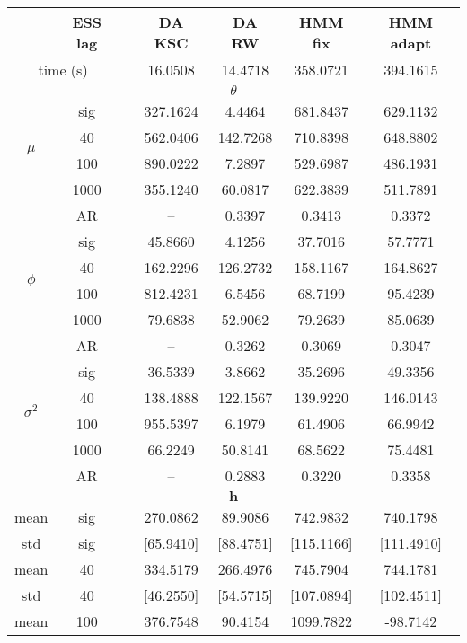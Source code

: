 { \renewcommand{\arraystretch}{1.2} 
\begin{table} 
\center 
\begin{tabular}{ccc cc cc} 
\hline 
 & ESS lag&& DA KSC & DA RW & HMM fix & HMM adapt \\ \hline  \hline
 \multicolumn{2}{c}{time (s)}& & 16.0508  & 14.4718  & 358.0721  & 394.1615  \\  \hline 
\multicolumn{7}{c}{$\theta$} \\ \hline 
\multirow{4}{*}{$\mu$}   & sig &  & 327.1624  & 4.4464  & 681.8437  & 629.1132  \\ 
 & 40 &  & 562.0406  & 142.7268  & 710.8398  & 648.8802  \\ 
 & 100 &  & 890.0222  & 7.2897  & 529.6987  & 486.1931  \\ 
 & 1000 &  & 355.1240  & 60.0817  & 622.3839  & 511.7891  \\ 
 & AR & & --  & 0.3397  & 0.3413  & 0.3372  \\ [1.3ex] 
\multirow{4}{*}{$\phi$}   & sig &  & 45.8660  & 4.1256  & 37.7016  & 57.7771  \\ 
 & 40 &  & 162.2296  & 126.2732  & 158.1167  & 164.8627  \\ 
 & 100 &  & 812.4231  & 6.5456  & 68.7199  & 95.4239  \\ 
 & 1000 &  & 79.6838  & 52.9062  & 79.2639  & 85.0639  \\ 
 & AR & & --  & 0.3262  & 0.3069  & 0.3047  \\ [1.3ex] 
\multirow{4}{*}{$\sigma^2$}   & sig &  & 36.5339  & 3.8662  & 35.2696  & 49.3356  \\ 
 & 40 &  & 138.4888  & 122.1567  & 139.9220  & 146.0143  \\ 
 & 100 &  & 955.5397  & 6.1979  & 61.4906  & 66.9942  \\ 
 & 1000 &  & 66.2249  & 50.8141  & 68.5622  & 75.4481  \\ 
 & AR & & --  & 0.2883  & 0.3220  & 0.3358  \\ [1.3ex] 
\hline 
\multicolumn{7}{c}{$ \bm{h} $} \\ \hline 
mean & sig &  & 270.0862  & 89.9086  & 742.9832  & 740.1798  \\ 
std & sig &  & [65.9410]  & [88.4751]  & [115.1166]  & [111.4910]  \\  [1ex]
mean & 40 &  & 334.5179  & 266.4976  & 745.7904  & 744.1781  \\ 
std & 40 &  & [46.2550]  & [54.5715]  & [107.0894]  & [102.4511]  \\  [1ex]
mean & 100 &  & 376.7548  & 90.4154  & 1099.7822  & -98.7142  \\ 

\end{tabular}
\end{table}}
